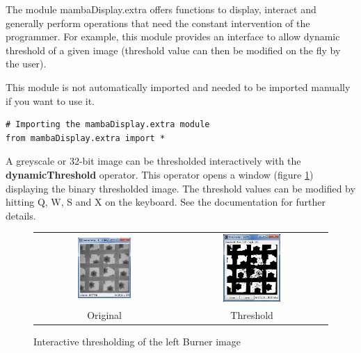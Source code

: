 \documentclass[a4paper,10pt,oneside]{article}
\begin{document}
The module mambaDisplay.extra offers functions to display, interact and generally 
perform operations that need the constant intervention of the programmer. For
example, this module provides an interface to allow dynamic threshold of a given
image (threshold value can then be modified on the fly by the user).

This module is not automatically imported and needed to be imported manually if
you want to use it.

\lstset{language=Python}
\begin{lstlisting}
# Importing the mambaDisplay.extra module
from mambaDisplay.extra import *
\end{lstlisting}

A greyscale or 32-bit image can be thresholded interactively with the
\textbf{dynamicThreshold} operator. This operator opens a window (figure \ref{fig:inter_thresh})
displaying the binary thresholded image. The threshold values can be modified by hitting
Q, W, S and X on the keyboard. See the documentation for further details.

\begin{figure}
\centering
\begin{tabular}{cc}
\includegraphics[width=0.4\textwidth]{images/burner.png} & 
\includegraphics[width=0.4\textwidth]{images/thresholder.png} \\ 
Original &
Threshold \\ 
\end{tabular}
\caption{Interactive thresholding of the left Burner image}
\label{fig:inter_thresh}
\end{figure}
\end{document}
